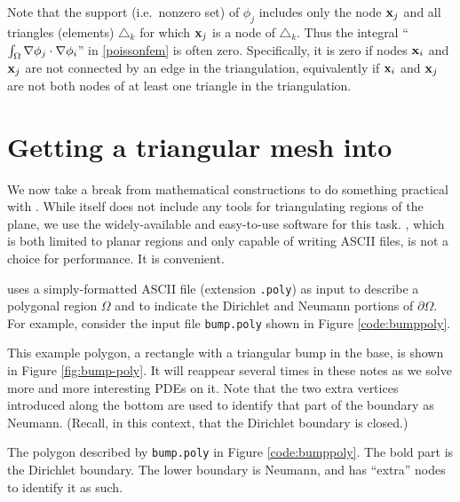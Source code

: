 Note that the support (i.e.~nonzero set) of $\phi_j$ includes only the node $\mathbf{x}_j$ and all triangles (elements) $\triangle_k$ for which $\mathbf{x}_j$ is a node of $\triangle_k$.  Thus the integral ``$\int_\Omega \nabla \phi_j \cdot \nabla \phi_i$'' in \eqref{poissonfem} is often zero.  Specifically, it is zero if nodes $\mathbf{x}_i$ and $\mathbf{x}_j$ are not connected by an edge in the triangulation, equivalently if $\mathbf{x}_i$ and $\mathbf{x}_j$ are not both nodes of at least one triangle in the triangulation.



\section{Getting a triangular mesh into \PETSc}

We now take a break from mathematical constructions to do something practical with \PETSc.  While \PETSc itself does not include any tools for triangulating regions of the plane, we use the widely-available and easy-to-use \Triangle software \citep{Shewchuk1996} for this task.  \Triangle, which is both limited to planar regions and only capable of writing ASCII files, is not a choice for performance.  It is convenient.

\Triangle uses a simply-formatted ASCII file (extension \texttt{.poly}) as input to describe a polygonal region $\Omega$ and to indicate the Dirichlet and Neumann portions of $\partial \Omega$.  For example, consider the input file \texttt{bump.poly} shown in Figure \ref{code:bumppoly}. 


This example polygon, a rectangle with a triangular bump in the base, is shown in Figure \ref{fig:bump-poly}.  It will reappear several times in these notes as we solve more and more interesting PDEs on it.  Note that the two extra vertices introduced along the bottom are used to identify that part of the boundary as Neumann.  (Recall, in this context, that the Dirichlet boundary is closed.)

\begin{marginfigure}

\caption{The polygon described by \texttt{bump.poly} in Figure \ref{code:bumppoly}.  The bold part is the Dirichlet boundary.  The lower boundary is Neumann, and has ``extra'' nodes to identify it as such.}
\label{fig:bump-poly}
\end{marginfigure}

